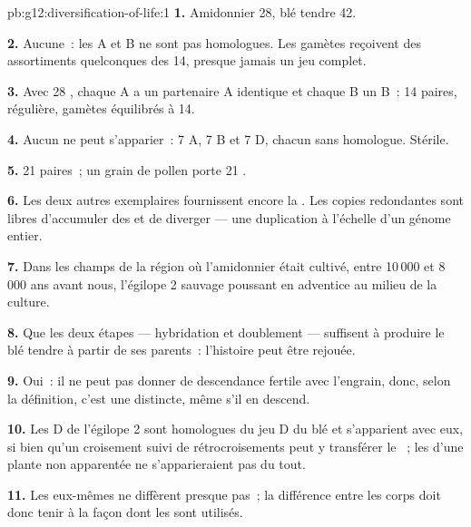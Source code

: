 \begin{solution}{pb:g12:diversification-of-life:1}
\textbf{1.} Amidonnier 28, blé tendre 42.

\textbf{2.} Aucune~: les  A et B ne sont pas homologues. Les
gamètes reçoivent des assortiments quelconques des 14, presque jamais
un jeu complet.

\textbf{3.} Avec 28 , chaque A a un partenaire A identique
et chaque B un B~: 14 paires,  régulière, gamètes équilibrés à 14.

\textbf{4.} Aucun ne peut s'apparier~: 7  A, 7 B et 7 D,
chacun sans homologue. Stérile.

\textbf{5.} 21 paires~; un grain de pollen porte 21 .

\textbf{6.} Les deux autres exemplaires fournissent encore la .
Les copies redondantes sont libres d'accumuler des  et de
diverger --- une duplication à l'échelle d'un génome entier.

\textbf{7.} Dans les champs de la région où l'amidonnier était cultivé,
entre 10\,000 et 8\,000 ans avant nous, l'égilope 2 sauvage poussant en
adventice au milieu de la culture.

\textbf{8.} Que les deux étapes --- hybridation et doublement ---
suffisent à produire le blé tendre à partir de ses parents~: l'histoire
peut être rejouée.

\textbf{9.} Oui~: il ne peut pas donner de descendance fertile avec
l'engrain, donc, selon la définition, c'est une  distincte, même
s'il en descend.

\textbf{10.} Les  D de l'égilope 2 sont homologues du jeu D
du blé et s'apparient avec eux, si bien qu'un croisement suivi de
rétrocroisements peut y transférer le ~; les  d'une
plante non apparentée ne s'apparieraient pas du tout.

\textbf{11.} Les  eux-mêmes ne diffèrent presque pas~; la
différence entre les corps doit donc tenir à la façon dont les 
sont utilisés.


\end{solution}
